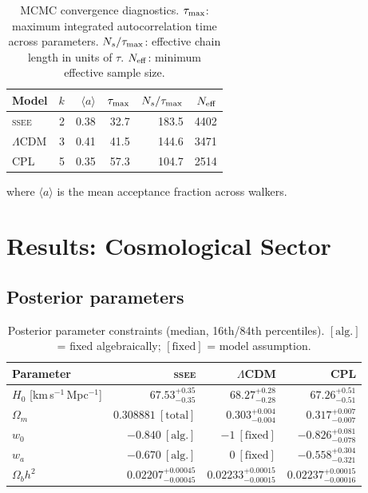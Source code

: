 \documentclass[12pt,a4paper]{article}
\newcommand{\SSEE}{\ifmmode\mathrm{SSEE}\else\textsc{ssee}\fi}
\newcommand{\LCDM}{\ifmmode\Lambda\mathrm{CDM}\else$\Lambda$CDM\fi}
\newcommand{\wz}{w_0}
\newcommand{\wa}{w_a}
\begin{document}
\begin{table}[H]
\centering
\caption{MCMC convergence diagnostics. $\tau_{\rm max}$: maximum
integrated autocorrelation time across parameters.
$N_s/\tau_{\rm max}$: effective chain length in units of $\tau$.
$N_{\rm eff}$: minimum effective sample size.}
\label{tab:convergence}
\begin{tabular}{lrrrrr}
\toprule
Model & $k$ & $\langle a\rangle$ & $\tau_{\rm max}$ & $N_s/\tau_{\rm max}$ & $N_{\rm eff}$ \\
\midrule
\SSEE & 2 & 0.38 & 32.7 & 183.5 & 4402 \\
\LCDM      & 3 & 0.41 & 41.5 & 144.6 & 3471 \\
CPL        & 5 & 0.35 & 57.3 & 104.7 & 2514 \\
\bottomrule
\end{tabular}
\end{table}
\noindent where $\langle a\rangle$ is the mean acceptance fraction across walkers.

\section{Results: Cosmological Sector}
\label{sec:results_cosmo}

\subsection{Posterior parameters}

\begin{table}[H]
\centering
\caption{Posterior parameter constraints (median, 16th/84th percentiles).
$[\mathrm{alg.}]$ = fixed algebraically; $[\mathrm{fixed}]$ = model assumption.}
\label{tab:posteriors}
\begin{tabular}{lrrr}
\toprule
Parameter & \SSEE & \LCDM & CPL \\
\midrule
$H_0$ [km\,s$^{-1}$\,Mpc$^{-1}$]
  & $67.53^{+0.35}_{-0.35}$
  & $68.27^{+0.28}_{-0.28}$
  & $67.26^{+0.51}_{-0.51}$ \\[3pt]
$\Omega_m$
  & $0.308881\ [\mathrm{total}]$
  & $0.303^{+0.004}_{-0.004}$
  & $0.317^{+0.007}_{-0.007}$ \\[3pt]
$\wz$
  & $-0.840\ [\mathrm{alg.}]$
  & $-1\ [\mathrm{fixed}]$
  & $-0.826^{+0.081}_{-0.078}$ \\[3pt]
$\wa$
  & $-0.670\ [\mathrm{alg.}]$
  & $0\ [\mathrm{fixed}]$
  & $-0.558^{+0.304}_{-0.321}$ \\[3pt]
$\Omega_b h^2$
  & $0.02207^{+0.00045}_{-0.00045}$
  & $0.02233^{+0.00015}_{-0.00015}$
  & $0.02237^{+0.00015}_{-0.00016}$ \\
\bottomrule
\end{tabular}
\end{table}
\end{document}
